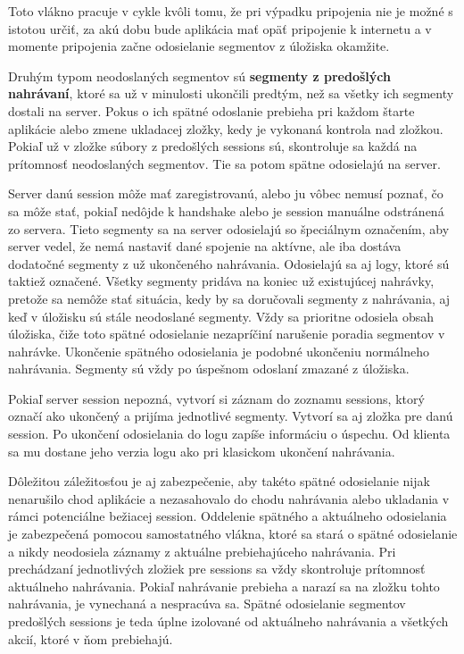 Toto vlákno pracuje v cykle kvôli tomu, že pri výpadku pripojenia nie je možné s istotou určiť, za akú dobu bude aplikácia mať opäť pripojenie k internetu a v momente pripojenia začne odosielanie segmentov z úložiska okamžite. 


\label{previous-recording}
Druhým typom neodoslaných segmentov sú \textbf{segmenty z predošlých nahrávaní}, ktoré sa už v minulosti ukončili predtým, než sa všetky ich segmenty dostali na server. Pokus o ich spätné odoslanie prebieha pri každom štarte aplikácie alebo zmene ukladacej zložky, kedy je vykonaná kontrola nad zložkou. Pokiaľ už v zložke súbory z predošlých sessions sú, skontroluje sa každá na prítomnosť neodoslaných segmentov. Tie sa potom spätne odosielajú na server.

Server danú session môže mať zaregistrovanú, alebo ju vôbec nemusí poznať, čo sa môže stať, pokiaľ nedôjde k handshake alebo je session manuálne odstránená zo servera. Tieto segmenty sa na server odosielajú so špeciálnym označením, aby server vedel, že nemá nastaviť dané spojenie na aktívne, ale iba dostáva dodatočné segmenty z už ukončeného nahrávania. Odosielajú sa aj logy, ktoré sú taktiež označené. Všetky segmenty pridáva na koniec už existujúcej nahrávky, pretože sa nemôže stať situácia, kedy by sa doručovali segmenty z nahrávania, aj keď v úložisku sú stále neodoslané segmenty. Vždy sa prioritne odosiela obsah úložiska, čiže toto spätné odosielanie nezapríčiní narušenie poradia segmentov v nahrávke. Ukončenie spätného odosielania je podobné ukončeniu normálneho nahrávania. Segmenty sú vždy po úspešnom odoslaní zmazané z úložiska.


Pokiaľ server session nepozná, vytvorí si záznam do zoznamu sessions, ktorý označí ako ukončený a prijíma jednotlivé segmenty. Vytvorí sa aj zložka pre danú session. Po ukončení odosielania do logu zapíše informáciu o úspechu. Od klienta sa mu dostane jeho verzia logu ako pri klasickom ukončení nahrávania. 


Dôležitou záležitosťou je aj zabezpečenie, aby takéto spätné odosielanie nijak nenarušilo chod aplikácie a nezasahovalo do chodu nahrávania alebo ukladania v rámci potenciálne bežiacej session. Oddelenie spätného a aktuálneho odosielania je zabezpečená pomocou samostatného vlákna, ktoré sa stará o spätné odosielanie a nikdy neodosiela záznamy z aktuálne prebiehajúceho nahrávania. Pri prechádzaní jednotlivých zložiek pre sessions sa vždy skontroluje prítomnosť aktuálneho nahrávania. Pokiaľ nahrávanie prebieha a narazí sa na zložku tohto nahrávania, je vynechaná a nespracúva sa. Spätné odosielanie segmentov predošlých sessions je teda úplne izolované od aktuálneho nahrávania a všetkých akcií, ktoré v ňom prebiehajú.

